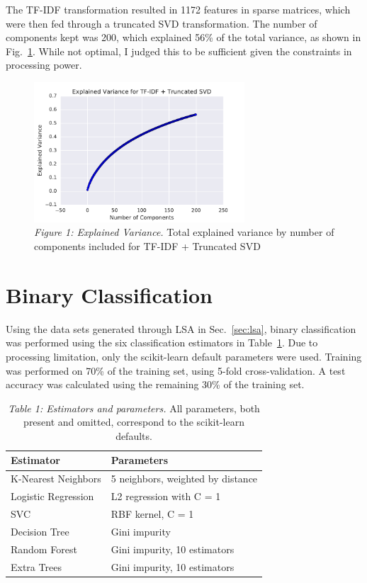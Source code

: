 \documentclass[11pt]{revtex4-1}
\newcommand{\secref}[1]{Sec.~\ref{sec:#1}}
\newcommand{\figref}[1]{Fig.~\ref{fig:#1}}
\newcommand{\tableref}[1]{Table~\ref{table:#1}}
\begin{document}
The TF-IDF transformation resulted in 1172 features in sparse
matrices, which were then fed through a truncated SVD transformation.
The number of components kept was 200, which explained 56\% of the
total variance, as shown in \figref{explained_variance}.  While not
optimal, I judged this to be sufficient given the constraints in
processing power.

\begin{figure}[tbh]
  \includegraphics[width=0.7\textwidth]{variation.pdf}
  \caption{\emph{Figure 1: Explained Variance.}  Total explained
    variance by number of components included for TF-IDF + Truncated
    SVD}
  \label{fig:explained_variance}
\end{figure}





\section{Binary Classification}
\label{sec:classification}

Using the data sets generated through LSA in \secref{lsa}, binary
classification was performed using the six classification estimators
in \tableref{estimators}.  Due to processing limitation, only the
scikit-learn default parameters were used.  Training was performed on
70\% of the training set, using 5-fold cross-validation.  A test
accuracy was calculated using the remaining 30\% of the training set.

\begin{table}
  \begin{tabular}{|l|l|}
    \hline
    Estimator & Parameters \\
    \hline
    K-Nearest Neighbors & 5 neighbors, weighted by distance \\
    Logistic Regression & L2 regression with C = 1 \\
    SVC & RBF kernel, C = 1 \\
    Decision Tree & Gini impurity \\
    Random Forest & Gini impurity, 10 estimators \\
    Extra Trees & Gini impurity, 10 estimators \\
    \hline
  \end{tabular}
  \label{table:estimators}
  \caption{\emph{Table 1: Estimators and parameters.}  All parameters,
    both present and omitted, correspond to the scikit-learn
    defaults.}
\end{table}
\end{document}
